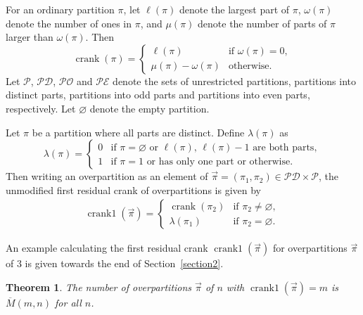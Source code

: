 \documentclass[pdftex]{sigma}
\numberwithin{equation}{section}
\newtheorem{Theorem}{Theorem}[section]
\newcommand\mylabel[1]{\label{#1}}
\begin{document}
For an ordinary partition $\pi$, let $\ell(\pi)$ denote the largest part of $\pi$, $\omega(\pi)$
denote the number of ones in $\pi$, and $\mu(\pi)$ denote the number of parts of $\pi$
larger than $\omega(\pi)$.
Then
\begin{equation*}%
\operatorname{crank}(\pi)=\begin{cases}
\ell(\pi) & \mbox{if $\omega(\pi)=0$}, \\
\mu(\pi)-\omega(\pi) & \mbox{otherwise}.
\end{cases}
\end{equation*}%
Let $\mathcal{P}$, $\mathcal{PD}$, $\mathcal{PO}$ and $\mathcal{PE}$ denote the sets of unrestricted partitions, partitions into distinct parts, partitions into odd parts and partitions into even parts, respectively. Let $\varnothing$ denote the empty partition.
\begin{Definition}
Let $\pi$ be a partition where all parts are distinct. Define $\lambda(\pi)$ as
\begin{equation*}%
\lambda(\pi)=\begin{cases}
0 & \mbox{if $\pi=\varnothing$ or $\ell(\pi), \,\ell(\pi)-1$ are both parts},
\\
1 & \mbox{if $\pi=1$ or has only one part or otherwise.}
\end{cases}
\end{equation*}%
Then writing an overpartition as an element of $\vec{\pi}=(\pi_1,\pi_2) \in \mathcal{PD} \times \mathcal{P}$, the unmodified first residual crank of overpartitions is given by
\begin{align}
\mylabel{eq:crank1}
\operatorname{crank1}(\vec{\pi})=\begin{cases}
\operatorname{crank}(\pi_2) & \mbox{if $\pi_2 \neq \varnothing$},
\\
\lambda(\pi_1) & \mbox{if $\pi_2 = \varnothing$.}
\end{cases}
\end{align}
\end{Definition}
An example calculating the first residual crank $\operatorname{crank1}(\vec{\pi})$ for overpartitions $\vec{\pi}$ of $3$ is given towards the end of Section~\ref{section2}.
\begin{Theorem}
\mylabel{thm:M1}
The number of overpartitions $\vec{\pi}$ of $n$ with $\operatorname{crank1}(\vec{\pi})=m$ is $\overline{M}(m,n)$ for all $n$.
\end{Theorem}
\end{document}

